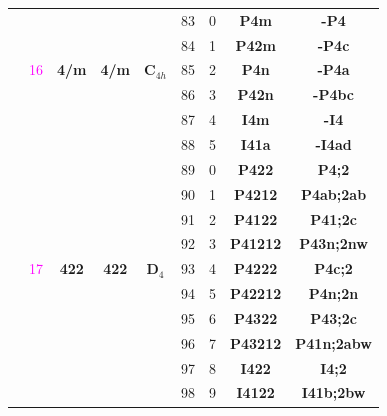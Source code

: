 \documentclass{article}      %
\begin{document}
\begin{small}
\begin{longtable}[c]{|c|c|c|c|c|c|c|c|c|}
          & & & & &\textrm{83} &\textrm{0} &\textbf{P4m}         &\textbf{-P4}\\\cline{6-9}            
          & & & & &\textrm{84} &\textrm{1} &\textbf{P42m}         &\textbf{-P4c}\\\cline{6-9}          
	  & \textrm{\textcolor{magenta}{16}} &\textbf{4/m} &\textbf{4/m} &$\mathbf{C}_{4h}$&\textrm{85} &\textrm{2} &\textbf{P4n} &\textbf{-P4a}\\\cline{6-9}
          & & & & &\textrm{86} &\textrm{3} &\textbf{P42n}         &\textbf{-P4bc}\\\cline{6-9}         
          & & & & &\textrm{87} &\textrm{4} &\textbf{I4m}         &\textbf{-I4}\\\cline{6-9}            
          & & & & &\textrm{88} &\textrm{5} &\textbf{I41a}         &\textbf{-I4ad}\\\cline{2-9}         
          & & & & &\textrm{89} &\textrm{0} &\textbf{P422}         &\textbf{P4;2}\\\cline{6-9}          
          & & & & &\textrm{90} &\textrm{1} &\textbf{P4212}       &\textbf{P4ab;2ab}\\\cline{6-9}       
          & & & & &\textrm{91} &\textrm{2} &\textbf{P4122}       &\textbf{P41;2c}\\\cline{6-9}         
          & & & & &\textrm{92} &\textrm{3} &\textbf{P41212}     &\textbf{P43n;2nw}\\\cline{6-9}        
	  & \textrm{\textcolor{magenta}{17}} &\textbf{422} &\textbf{422} &$\mathbf{D}_4$ &\textrm{93} &\textrm{4} &\textbf{P4222}  &\textbf{P4c;2}\\\cline{6-9} 
          & & & & &\textrm{94} &\textrm{5} &\textbf{P42212}     &\textbf{P4n;2n}\\\cline{6-9}          
          & & & & &\textrm{95} &\textrm{6} &\textbf{P4322}       &\textbf{P43;2c}\\\cline{6-9}         
          & & & & &\textrm{96} &\textrm{7} &\textbf{P43212}     &\textbf{P41n;2abw}\\\cline{6-9}       
          & & & & &\textrm{97} &\textrm{8} &\textbf{I422}         &\textbf{I4;2}\\\cline{6-9}          
          & & & & &\textrm{98} &\textrm{9} &\textbf{I4122}       &\textbf{I41b;2bw}\\\cline{2-9}       

\end{longtable}
\end{small}
\end{document}
